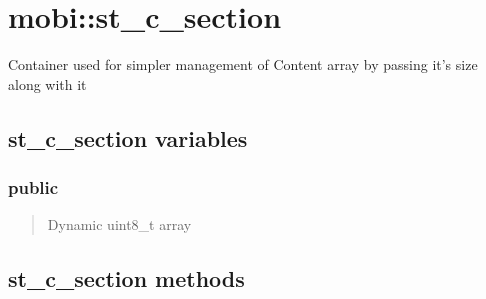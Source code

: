\documentclass[letterpaper,10pt,english]{sphinxmanual}
\begin{document}
\section{mobi::st\_c\_section}
\label{st_c_section:mobi-st-c-section}\label{st_c_section::doc}

\begin{fulllineitems}
\label{st_c_section:mobi::st_c_section}
Container used for simpler management of Content array by passing it's
size along with it

\end{fulllineitems}



\subsection{st\_c\_section variables}
\label{st_c_section:st-c-section-variables}

\subsubsection{public}
\label{st_c_section:public}\begin{quote}

\begin{fulllineitems}
\label{st_c_section:st_c_section::content__uint8P}
Dynamic uint8\_t array

\end{fulllineitems}


\begin{fulllineitems}
\label{st_c_section:st_c_section::size__unsigned-i}
\end{fulllineitems}

\end{quote}


\subsection{st\_c\_section methods}
\label{st_c_section:st-c-section-methods}
\end{document}
